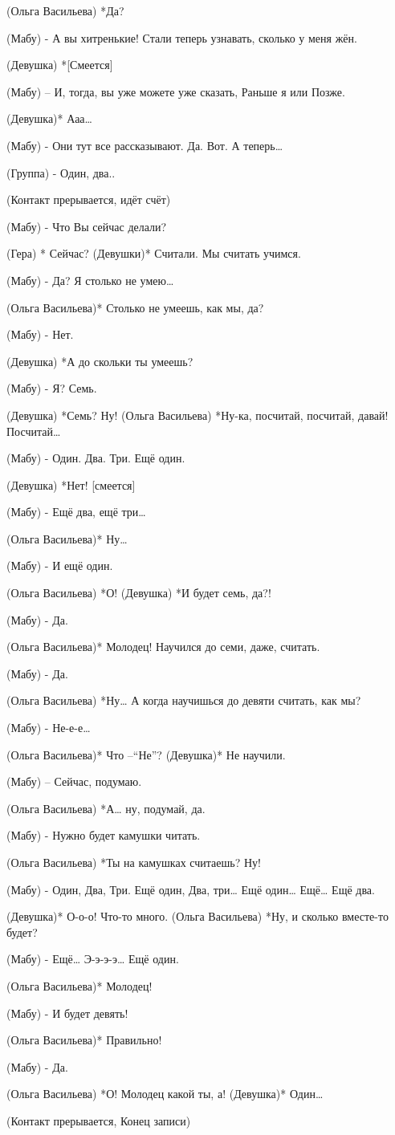 (Ольга Васильева) *Да?

(Мабу) - А вы хитренькие! Стали теперь узнавать, сколько у меня жён.

(Девушка) *[Смеется]

(Мабу) – И, тогда, вы уже можете уже сказать, Раньше я или Позже. 

(Девушка)* Ааа…

(Мабу) - Они тут все рассказывают. Да. Вот. А теперь…

(Группа) - Один, два..

(Контакт прерывается, идёт счёт)

(Мабу) - Что Вы сейчас делали?

(Гера) * Сейчас?
(Девушки)* Считали. Мы считать учимся.

(Мабу) - Да? Я столько не умею…

(Ольга Васильева)* Столько не умеешь, как мы, да?

(Мабу) - Нет.

(Девушка) *А до скольки ты умеешь?

(Мабу) - Я? Семь.

(Девушка) *Семь? Ну!
(Ольга Васильева) *Ну-ка, посчитай, посчитай, давай! Посчитай…

(Мабу) - Один. Два. Три. Ещё один.

(Девушка) *Нет! [смеется]

(Мабу) - Ещё два, ещё три…

(Ольга Васильева)* Ну…

(Мабу) - И ещё один.

(Ольга Васильева) *О!
(Девушка) *И будет семь, да?!

(Мабу) - Да.

(Ольга Васильева)* Молодец! Научился до семи, даже, считать.

(Мабу) - Да.

(Ольга Васильева) *Ну… А когда научишься до девяти считать, как мы?

(Мабу) - Не-е-е…

(Ольга Васильева)* Что –“Не”?
(Девушка)* Не научили.

(Мабу) – Сейчас, подумаю.

(Ольга Васильева) *А… ну, подумай, да.

(Мабу) - Нужно будет камушки читать.

(Ольга Васильева) *Ты на камушках считаешь? Ну!

(Мабу) - Один, Два, Три. Ещё один, Два, три… Ещё один… Ещё… Ещё два.

(Девушка)* О-о-о! Что-то много.
(Ольга Васильева) *Ну, и сколько вместе-то будет?

(Мабу) - Ещё… Э-э-э-э… Ещё один.

(Ольга Васильева)* Молодец!

(Мабу) - И будет девять!

(Ольга Васильева)* Правильно!

(Мабу) - Да.

(Ольга Васильева) *О! Молодец какой ты, а!
(Девушка)* Один…

(Контакт прерывается, Конец записи)